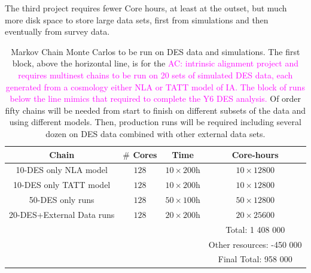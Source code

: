 \documentclass[12pt]{article}
\newcommand{\acampos}[1]{\textcolor{magenta}{AC: #1}}
\begin{document}
\begin{small}
The third project requires fewer Core hours, at least at the outset, but much more disk space to store large data sets, first from simulations and then eventually from survey data. 



\begin{table}[h!]
\begin{center}
\begin{tabular}{c|cc|c}
 Chain         & $\#$ Cores &  Time & Core-hours   \\ 
\hline
10-DES only NLA model & $128$ & $10\times200$h & $10\times12800$  \\ 
10-DES only TATT model & $128$ & $10\times200$h & $10\times12800$  \\  
\hline
 50-DES only runs & $128$ & $50\times100$h & $50\times12800$  \\  
 20-DES+External Data runs & $128$ & $20\times200$h & $20\times25600$  \\  
\hline
& &  & Total: 1 408 000\\
& &  & Other resources: -450 000\\
& &  & Final Total: 958 000\\
\end{tabular}


\caption{Markov Chain Monte Carlos to be run on DES data and simulations. The first block, above the horizontal line, is for the \acampos{intrinsic alignment project and requires multinest chains to be run on 20 sets of simulated DES data, each generated from a cosmology either NLA or TATT model of IA. %
The block of runs below the line mimics that required to complete the Y6 DES analysis.} Of order fifty chains will be needed from start to finish on different subsets of the data and using different models. Then, production runs will be required including several dozen on DES data combined with other external data sets.}
\label{tab:post}
\end{center}
\end{table}



\end{small}
\end{document}

